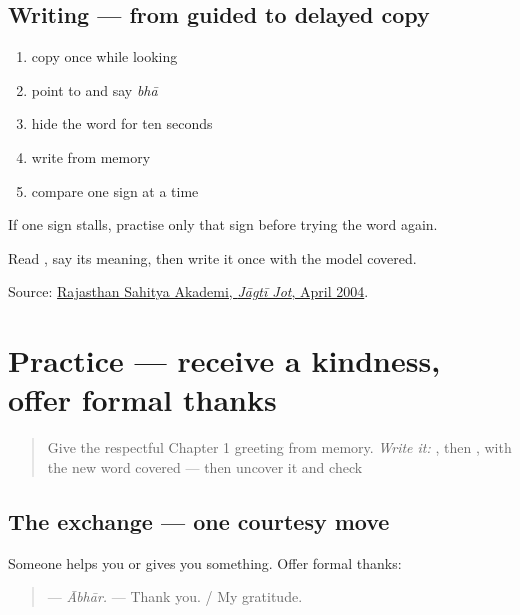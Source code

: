 \subsection*{Writing — from guided to delayed copy}
\begin{enumerate}
\raggedright
  \item copy \textbf{} once while looking
  \item point to \textbf{} and say \emph{bhā}
  \item hide the word for ten seconds
  \item write \textbf{} from memory
  \item compare one sign at a time
\end{enumerate}

If one sign stalls, practise only that sign before trying the word again.

\begin{tcolorbox}[breakable,colback=teal!4,colframe=teal!35!black,title={Before you move on}]
Read \textbf{}, say its meaning, then write it once with the model covered.

Source: \href{https://rsad.artandculture.rajasthan.gov.in/content/dam/doitassets/art-and-culture/Rajasthani-Bhasha-Sahitya-Avm-Sanskriti-Academy-Bikaner/pdf/JJ\_All\_Pdf/JJ\_33\_01\_01\_April\_to\_April\_2004.pdf}{Rajasthan Sahitya Akademi, \emph{Jāgtī Jot}, April 2004}.
\end{tcolorbox}
\section[Practice]{Practice — receive a kindness, offer formal thanks}

\label{lesson:MW-C02-practice}



\begin{quote}
Give the respectful Chapter 1 greeting from memory. \emph{Write it:} \textbf{}, then \textbf{}, with the new word covered — then uncover it and check
\end{quote}

\subsection*{The exchange — one courtesy move}
Someone helps you or gives you something. Offer formal thanks:

\begin{quote}
\textbf{} — \emph{Ābhār.} — Thank you. / My gratitude.
\end{quote}

